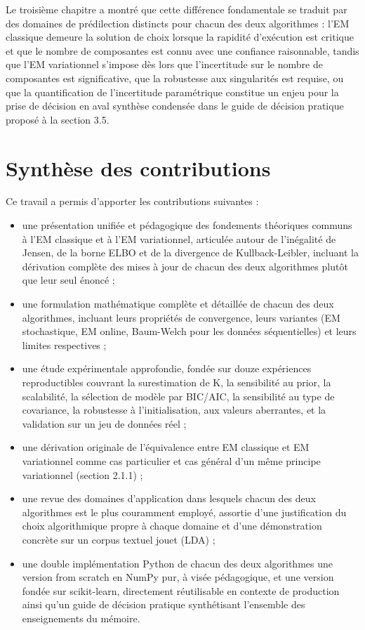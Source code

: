 Le troisième chapitre a montré que cette différence fondamentale se traduit par des domaines de prédilection distincts pour chacun des deux algorithmes : l'EM classique demeure la solution de choix lorsque la rapidité d'exécution est critique et que le nombre de composantes est connu avec une confiance raisonnable, tandis que l'EM variationnel s'impose dès lors que l'incertitude sur le nombre de composantes est significative, que la robustesse aux singularités est requise, ou que la quantification de l'incertitude paramétrique constitue un enjeu pour la prise de décision en aval  synthèse condensée dans le guide de décision pratique proposé à la section 3.5.

\section*{Synthèse des contributions}
Ce travail a permis d'apporter les contributions suivantes :

\begin{itemize}
\item une présentation unifiée et pédagogique des fondements théoriques communs à l'EM classique et à l'EM variationnel, articulée autour de l'inégalité de Jensen, de la borne ELBO et de la divergence de Kullback-Leibler, incluant la dérivation complète des mises à jour de chacun des deux algorithmes plutôt que leur seul énoncé ;
\item une formulation mathématique complète et détaillée de chacun des deux algorithmes, incluant leurs propriétés de convergence, leurs variantes (EM stochastique, EM online, Baum-Welch pour les données séquentielles) et leurs limites respectives ;
\item une étude expérimentale approfondie, fondée sur douze expériences reproductibles couvrant la surestimation de K, la sensibilité au prior, la scalabilité, la sélection de modèle par BIC/AIC, la sensibilité au type de covariance, la robustesse à l'initialisation, aux valeurs aberrantes, et la validation sur un jeu de données réel ;
\item une dérivation originale de l'équivalence entre EM classique et EM variationnel comme cas particulier et cas général d'un même principe variationnel (section 2.1.1) ;
\item une revue des domaines d'application dans lesquels chacun des deux algorithmes est le plus couramment employé, assortie d'une justification du choix algorithmique propre à chaque domaine et d'une démonstration concrète sur un corpus textuel jouet (LDA) ;
\item une double implémentation Python de chacun des deux algorithmes  une version from scratch en NumPy pur, à visée pédagogique, et une version fondée sur scikit-learn, directement réutilisable en contexte de production  ainsi qu'un guide de décision pratique synthétisant l'ensemble des enseignements du mémoire.
\end{itemize}

